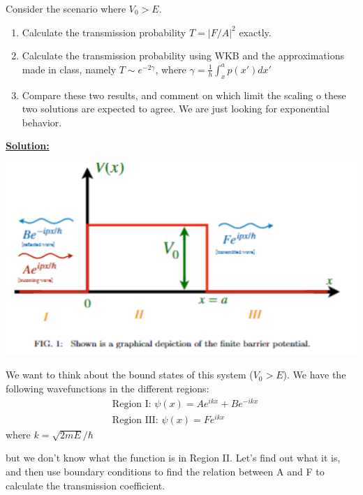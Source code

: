 \documentclass{article}
\begin{document}
Consider the scenario where $V_0 > E$.
\begin{enumerate}[label=(\alph*)]
  \item Calculate the transmission probability $T = |F/A|^2$ exactly.
  \item Calculate the transmission probability using WKB and the approximations made in class, namely $T \sim e^{-2\gamma}$, where $\gamma = \frac{1}{h} \int_{x}^{a} p(x')dx'$
  \item Compare these two results, and comment on which limit the scaling o these two solutions are expected to agree. We are just looking for exponential behavior.
\end{enumerate} 

\vskip 0.5cm
\underline{\textbf{Solution:}}
\begin{center}
  \includegraphics*[scale=0.50]{Q2 potential .png}
\end{center}

We want to think about the bound states of this system ($V_0 > E$).
We have the following wavefunctions in the different regions:
\begin{align*}
  &\text{Region I: } \psi(x) = Ae^{ikx} + Be^{-ikx} \\
  &\text{Region III: } \psi(x) = Fe^{ikx}
\end{align*}
where $k = \sqrt{2mE}/ \hbar$

but we don't know what the function is in Region II. Let's find out what it is, and then use boundary conditions to find the relation between A and F to calculate the transmission coefficient.
\end{document}
